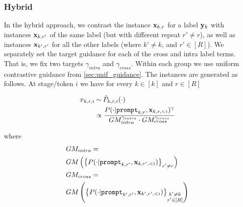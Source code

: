  \subsubsection{Hybrid \corrsyn{}}

 In the hybrid approach, we contrast the instance $\mathbf{x}_{k,r}$ for a label $\mathbf{y}_k$ with instances $\mathbf{x}_{k,r'}$ of the same label (but with different repeat $r'\neq r$), as well as instances $\mathbf{x}_{k',r'}$ for all the other labels (where $k'\neq k$, and $r'\in [R]$). We separately set the target guidance for each of the cross and intra label terms. That is, we fix two targets $\gamma_{intra}$ and $\gamma_{cross}$. Within each group we use uniform contrastive guidance from \ref{sec:unif_guidance}. The instances are generated as follows. At stage/token $i$ we have for every $k\in[k]$ and $r\in [R]$
 
 \begin{align}
 \begin{aligned}
      x_{k,r,i}&\mathbin{\overset{}{\kern0pt\sim}}\tilde {P}_{k,r,i}(\cdot) \\
      &\propto \frac{P(\cdot| \mathtt{prompt}_{k,r},\mathbf{x}_{k,r,<i})^{\gamma}}{GM_{intra}^{\gamma_{intra}}\cdot GM_{cross}^{\gamma_{cross}}}\label{eq:K-Corr-hybrid-1}
 \end{aligned}
 \end{align}

 where 
 \begin{align}
 \begin{aligned}
     &GM_{intra}=\\
     &GM\left(\left\{P(\cdot| \mathtt{prompt}_{k,r'},\mathbf{x}_{k,r',<i})\right\}_{\substack {r'\neq r}}\right)\\
     &GM_{cross}=\\
     &GM\left(\left\{P(\cdot| \mathtt{prompt}_{k',r'},\mathbf{x}_{k',r',<i})\right\}_{\substack {k'\neq k\\ r'\in[R]}}\right)
\end{aligned}
 \end{align}
 
